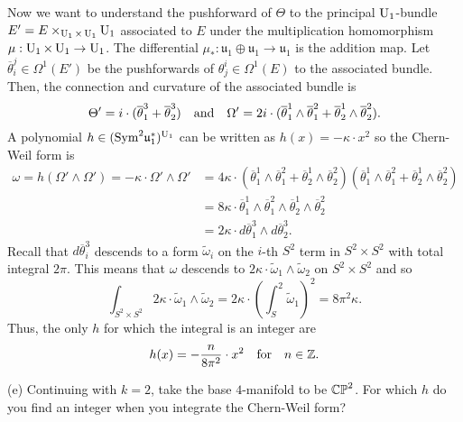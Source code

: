 \documentclass{../../templates/lkx_pset}
\begin{document}
\begin{parts}
	Now we want to understand the pushforward of $\Theta$ to the principal $\operatorname{U}_1$-bundle $E'=E\times_{\operatorname{U}_1\times \operatorname{U}_1} \operatorname{U}_1$ associated to $E$ under the multiplication homomorphism $\mu : \operatorname{U}_1\times \operatorname{U}_1\to \operatorname{U}_1$. The differential $\mu_* : \mathfrak{u}_1\oplus \mathfrak{u}_1 \to \mathfrak{u}_1$ is the addition map. Let $\overline{\theta}_i^j\in \Omega^1(E')$ be the pushforwards of $\theta^i_j\in \Omega^1(E)$ to the associated bundle. Then, the connection and curvature of the associated bundle is
	\[
		\Theta' = i\cdot (\overline{\theta}_1^3 + \overline{\theta}_2^3)\quad\textrm{and}\quad\Omega' = 2i\cdot (
		\overline{\theta}^1_1\wedge \overline{\theta}^2_1+
		\overline{\theta}^1_2\wedge \overline{\theta}^2_2
		).
	\]
	A polynomial $h\in (\textrm{Sym}^2\mathfrak{u}_1^*)^{\operatorname{U}_1}$ can be written as $h(x) = -\kappa \cdot x^2$ so the Chern-Weil form is
	\[
		\begin{aligned}
			\omega = h(\Omega'\wedge \Omega') = -\kappa \cdot \Omega'\wedge \Omega'
			 & = 4\kappa\cdot
			(\overline{\theta}^1_1\wedge \overline{\theta}^2_1+ \overline{\theta}^1_2\wedge \overline{\theta}^2_2)
			(\overline{\theta}^1_1\wedge \overline{\theta}^2_1+ \overline{\theta}^1_2\wedge \overline{\theta}^2_2) \\
			 & = 8\kappa\cdot
			\overline{\theta}^1_1\wedge \overline{\theta}^2_1\wedge
			\overline{\theta}^1_2\wedge \overline{\theta}^2_2                                                      \\
			 & = 2\kappa\cdot d\overline{\theta}^3_1\wedge d\overline{\theta}^3_2.
		\end{aligned}
	\]
	Recall that $d\overline{\theta}^3_i$ descends to a form $\widetilde{\omega}_i$ on the $i$-th $S^2$ term in $S^2\times S^2$ with total integral $2\pi$. This means that $\omega$ descends to $2\kappa\cdot \widetilde{\omega}_1 \wedge \widetilde{\omega}_2$ on $S^2\times S^2$ and so
	\[
		\int_{S^2\times S^2} 2\kappa\cdot \widetilde{\omega}_1\wedge \widetilde{\omega}_2 = 2\kappa\cdot\left(\int_S^2 \widetilde{\omega}_1\right)^2 = 8\pi^2\kappa.
	\]
	Thus, the only $h$ for which the integral is an integer are
	\[
		h(x) = -\frac{n}{8\pi^2}\cdot x^2\quad\textrm{for}\quad n\in \mathbb{Z}.
	\]

	\begin{part}{(e)}
		Continuing with $k=2$, take the base $4$-manifold to be $\mathbb{CP}^2$. For which $h$ do you find an integer when you integrate the Chern-Weil form?
	\end{part}
\end{parts}
\end{document}
